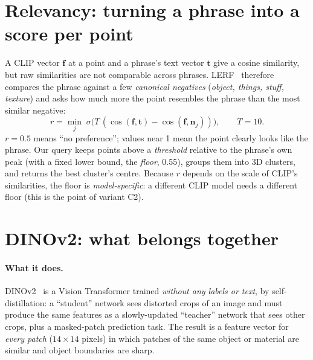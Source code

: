 \documentclass[11pt,a4paper]{article}
\newcommand{\vect}[1]{\mathbf{#1}}
\begin{document}
\section{Relevancy: turning a phrase into a score per point}

A CLIP vector $\vect{f}$ at a point and a phrase's text vector $\vect{t}$ give a cosine similarity, but raw
similarities are not comparable across phrases. LERF~\cite{lerf} therefore compares the phrase against a few
\emph{canonical negatives} (\emph{object, things, stuff, texture}) and asks how much more the point resembles the
phrase than the most similar negative:
\begin{equation}
  r = \min_j \; \sigma\bigl(T\,(\cos(\vect{f}, \vect{t}) - \cos(\vect{f}, \vect{n}_j))\bigr), \qquad T = 10 .
\end{equation}
$r = 0.5$ means ``no preference''; values near 1 mean the point clearly looks like the phrase. Our query keeps
points above a \emph{threshold} relative to the phrase's own peak (with a fixed lower bound, the \emph{floor},
0.55), groups them into 3D clusters, and returns the best cluster's centre. Because $r$ depends on the scale of
CLIP's similarities, the floor is \emph{model-specific}: a different CLIP model needs a different floor (this
is the point of variant C2).

\section{DINOv2: what belongs together}

\paragraph{What it does.} DINOv2~\cite{dinov2} is a Vision Transformer trained \emph{without any labels or text}, by
self-distillation: a ``student'' network sees distorted crops of an image and must produce the same features as a
slowly-updated ``teacher'' network that sees other crops, plus a masked-patch prediction task. The result is a
feature vector for \emph{every patch} ($14\times14$ pixels) in which patches of the same object or material are
similar and object boundaries are sharp.
\end{document}
